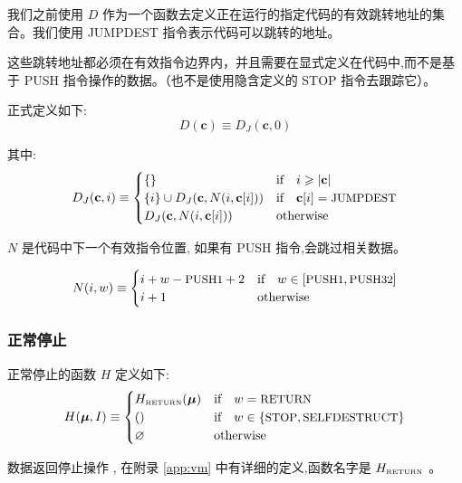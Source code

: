 \documentclass[9pt,oneside]{amsart}
\begin{document}
\begin{multicols}{2}
我们之前使用 $D$ 作为一个函数去定义正在运行的指定代码的有效跳转地址的集合。我们使用 JUMPDEST 指令表示代码可以跳转的地址。

这些跳转地址都必须在有效指令边界内，并且需要在显式定义在代码中,而不是基于 {\small PUSH} 指令操作的数据。（也不是使用隐含定义的 {\small STOP} 指令去跟踪它）。

正式定义如下:
\begin{equation}
D(\mathbf{c}) \equiv D_J(\mathbf{c}, 0)
\end{equation}

其中:
\begin{equation}
D_J(\mathbf{c}, i) \equiv \begin{cases}
\{\} & \text{if} \quad i \geqslant |\mathbf{c}|  \\
\{ i \} \cup D_J(\mathbf{c}, N(i, \mathbf{c}[i])) & \text{if} \quad \mathbf{c}[i] = \text{\small JUMPDEST} \\
D_J(\mathbf{c}, N(i, \mathbf{c}[i])) & \text{otherwise} \\
\end{cases}
\end{equation}

$N$ 是代码中下一个有效指令位置, 如果有 {\small PUSH} 指令,会跳过相关数据。

\begin{equation}
N(i, w) \equiv \begin{cases}
i + w - \text{\small PUSH1} + 2 & \text{if} \quad w \in [\text{\small PUSH1}, \text{\small PUSH32}] \\
i + 1 & \text{otherwise} \end{cases}
\end{equation}

\subsubsection{正常停止}

正常停止的函数 $H$ 定义如下:
\begin{equation}
H(\boldsymbol{\mu}, I) \equiv \begin{cases}
H_{\text{\tiny RETURN}}(\boldsymbol{\mu}) & \text{if} \quad w = \text{\small RETURN} \\
() & \text{if} \quad w \in \{ \text{\small STOP}, \text{\small SELFDESTRUCT} \} \\
\varnothing & \text{otherwise}
\end{cases}
\end{equation}

数据返回停止操作 , 在附录 \ref{app:vm} 中有详细的定义,函数名字是 $H_{\text{\tiny RETURN}}$ 。


\end{multicols}
\end{document}
